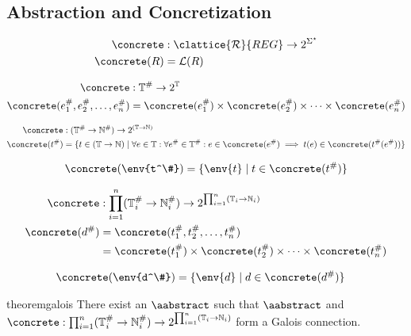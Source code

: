 \subsection{Abstraction and Concretization}\label{subsec:abstraction-and-concretization}

\begin{align}
    \concrete &: \clattice{\mathcal{R}}{REG} \rightarrow 2^{\Sigma^\star} \\
    \concrete(R) &= \mathcal{L}(R)
\end{align}

\begin{align}
    \concrete &: \mathbb{T}^\# \rightarrow 2^\mathbb{T} \\
    \concrete (e_1^\#, e_2^\#, \dots, e_n^\#) &= \concrete(e_1^\#) \times \concrete(e_2^\#) \times \dots \times \concrete(e_n^\#)
\end{align}

\begin{align}
    \concrete &: (\mathbb{T}^\# \rightarrow \mathbb{N}^\#) \rightarrow 2^{(\mathbb{T} \rightarrow \mathbb{N})} \\
    \concrete(t^\#) &= \{t \in (\mathbb{T} \rightarrow \mathbb{N}) \mid \forall e \in \mathbb{T} : \forall e^\# \in \mathbb{T}^\# : e \in \concrete(e^\#) \implies t(e) \in \concrete(t^\#(e^\#))\}
\end{align}

\begin{align}
    \concrete(\env{t^\#}) = \{ \env{t} \mid t \in \concrete(t^\#) \}
\end{align}

\begin{align}
    \concrete &: \prod_{i = 1}^{n} (\mathbb{T}^\#_i \rightarrow \mathbb{N}^\#_i) \rightarrow 2^{\prod_{i = 1}^{n} (\mathbb{T}_i \rightarrow \mathbb{N}_i)} \\
    \concrete(d^\#) &= \concrete(t_1^\#, t_2^\#, \dots, t_n^\#) \\
                    &= \concrete(t_1^\#) \times \concrete(t_2^\#) \times \dots \times \concrete(t_n^\#)
\end{align}

\begin{align}
    \concrete(\env{d^\#}) &= \{ \env{d} \mid d \in \concrete(d^\#) \}
\end{align}

\begin{restatable}{theorem}{galois}\label{thm:galios}
    There exist an $\aabstract$ such that $\aabstract$ and $\concrete : \prod_{i = 1}^{n} (\mathbb{T}^\#_i \rightarrow \mathbb{N}^\#_i) \rightarrow 2^{\prod_{i = 1}^{n} (\mathbb{T}_i \rightarrow \mathbb{N}_i)}$ form a Galois connection.
\end{restatable}
